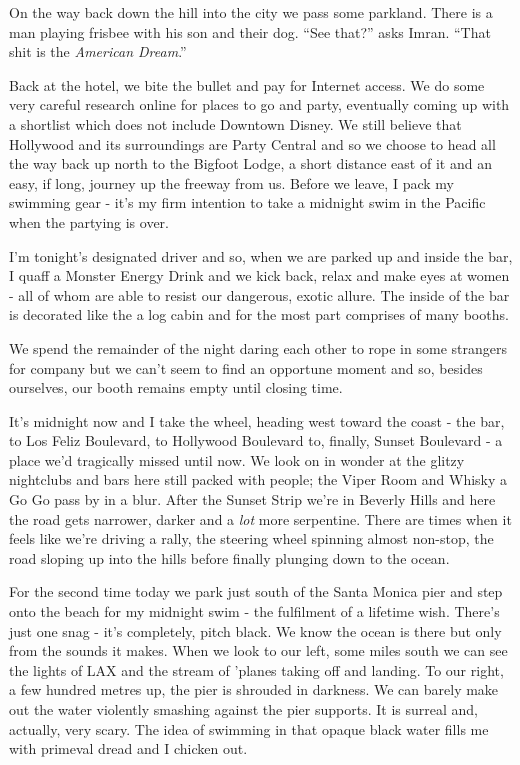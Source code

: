 \documentclass[a5paper,titlepage,11pt]{book}
\begin{document}
On the way back down the hill into the city we pass some parkland.  There is a man playing frisbee with his son and their dog. ``See that?'' asks Imran.  ``That shit is the \emph{American Dream}.''

Back at the hotel, we bite the bullet and pay for Internet access.  We do some very careful research online for places to go and party, eventually coming up with a shortlist which does not include Downtown Disney.  We still believe that Hollywood and its surroundings are Party Central and so we choose to head all the way back up north to the Bigfoot Lodge, a short distance east of it and an easy, if long, journey up the freeway from us.  Before we leave, I pack my swimming gear - it's my firm intention to take a midnight swim in the Pacific when the partying is over.

I'm tonight's designated driver and so, when we are parked up and inside the bar, I quaff a Monster Energy Drink and we kick back, relax and make eyes at women - all of whom are able to resist our dangerous, exotic allure.  The inside of the bar is decorated like the a log cabin and for the most part comprises of many booths.

We spend the remainder of the night daring each other to rope in some strangers for company but we can't seem to find an opportune moment and so, besides ourselves, our booth remains empty until closing time.

It's midnight now and I take the wheel, heading west toward the coast - the bar, to Los Feliz Boulevard, to Hollywood Boulevard to, finally, Sunset Boulevard - a place we'd tragically missed until now.  We look on in wonder at the glitzy nightclubs and bars here still packed with people; the Viper Room and Whisky a Go Go pass by in a blur.  After the Sunset Strip we're in Beverly Hills and here the road gets narrower, darker and a \emph{lot} more serpentine.  There are times when it feels like we're driving a rally, the steering wheel spinning almost non-stop, the road sloping up into the hills before finally plunging down to the ocean.

For the second time today we park just south of the Santa Monica pier and step onto the beach for my midnight swim - the fulfilment of a lifetime wish.  There's just one snag - it's completely, pitch black.  We know the ocean is there but only from the sounds it makes.  When we look to our left, some miles south we can see the lights of LAX and the stream of 'planes taking off and landing.  To our right, a few hundred metres up, the pier is shrouded in darkness.  We can barely make out the water violently smashing against the pier supports.  It is surreal and, actually, very scary.  The idea of swimming in that opaque black water fills me with primeval dread and I chicken out.
\end{document}
